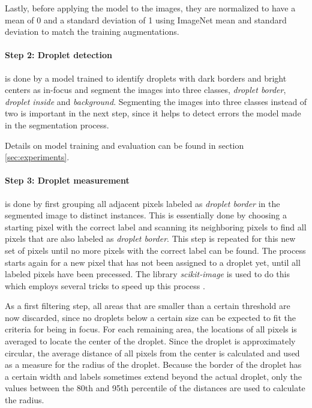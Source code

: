 Lastly, before applying the model to the images, they are normalized to have a mean of 0 and a standard deviation of 1 using ImageNet mean and standard deviation to match the training augmentations.

\paragraph{Step 2: Droplet detection} is done by a model trained to identify droplets with dark borders and bright centers as in-focus and segment the images into three classes, \emph{droplet border}, \emph{droplet inside} and \emph{background}.
Segmenting the images into three classes instead of two is important in the next step, since it helps to detect errors the model made in the segmentation process.

Details on model training and evaluation can be found in section \ref{sec:experiments}.

\paragraph{Step 3: Droplet measurement} is done by first grouping all adjacent pixels labeled as \emph{droplet border} in the segmented image to distinct instances. 
This is essentially done by choosing a starting pixel with the correct label and scanning its neighboring pixels to find all pixels that are also labeled as \emph{droplet border}.
This step is repeated for this new set of pixels until no more pixels with the correct label can be found.
The process starts again for a new pixel that has not been assigned to a droplet yet, until all labeled pixels have been precessed.
The library \emph{scikit-image}\cite{waltScikitimageImageProcessing2014} is used to do this which employs several tricks to speed up this process \cite{wuOptimizingConnectedComponent2005}. 

As a first filtering step, all areas that are smaller than a certain threshold are now discarded, since no droplets below a certain size can be expected to fit the criteria for being in focus.
For each remaining area, the locations of all pixels is averaged to locate the center of the droplet.
Since the droplet is approximately circular, the average distance of all pixels from the center is calculated and used as a measure for the radius of the droplet.
Because the border of the droplet has a certain width and labels sometimes extend beyond the actual droplet, only the values between the 80th and 95th percentile of the distances are used to calculate the radius.


